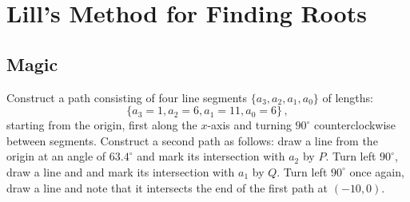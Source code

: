 

\chapter{Lill's Method for Finding Roots}\label{c.lill}

\section{Magic}\label{s.magic}

Construct a path consisting of four line segments $\{a_3,a_2,a_1,a_0\}$ of lengths:
\[
\{a_3=1,a_2=6,a_1=11,a_0=6\}\,,
\]
starting from the origin, first along the $x$-axis and turning $90^\circ$ counterclockwise between segments. Construct a second path as follows: draw a line from the origin at an angle of $63.4^\circ$ and mark its intersection with $a_2$ by $P$. Turn left $90^\circ$, draw a line and and mark its intersection with $a_1$ by $Q$. Turn left $90^\circ$ once again, draw a line and note that it intersects the end of the first path at $(-10,0)$. %

